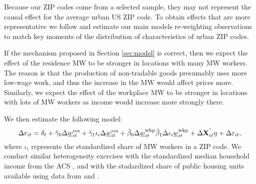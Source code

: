 Because our ZIP codes come from a selected sample, they may not represent
the causal effect for the average urban US ZIP code.
To obtain effects that are more representative we follow 
\textcite{Hainmueller2012} and estimate our main models re-weighting 
observations to match key moments of the distribution of characteristics of 
urban ZIP codes.

If the mechanism proposed in Section \ref{sec:model} is correct, then we
expect the effect of the residence MW to be stronger in locations with many 
MW workers.
The reason is that the production of non-tradable goods presumably uses more
low-wage work, and thus the increase in the MW would affect prices more.
Similarly, we expect the effect of the workplace MW to be stronger in locations
with lots of MW workers as income would increase more strongly there.

We then estimate the following model:
\begin{equation}\label{eq:fd_heterogeneity}
    \Delta r_{it} = \delta_t
                  + \tilde\gamma_0 \Delta \underline{w}^{\text{res}}_{it} + \tilde\gamma_1 \iota_i \Delta \underline{w}^{\text{res}}_{it}
                  + \tilde\beta_0 \Delta \underline{w}^{\text{wkp}}_{it} \tilde\beta_1 \Delta \iota_i \underline{w}^{\text{wkp}}_{it}
                  + \Delta \mathbf{X}^{'}_{it}\eta
                  + \Delta \varepsilon_{it} ,
\end{equation}
where $\iota_i$ represents the standardized share of MW workers in a ZIP code.
We conduct similar heterogeneity exercises with the standardized median household 
income from the ACS \parencite{CensusACS}, and with the stadardized share of public housing 
units available using data from \textcite{hudHousing} and \parencite{CensusDecennial}.

